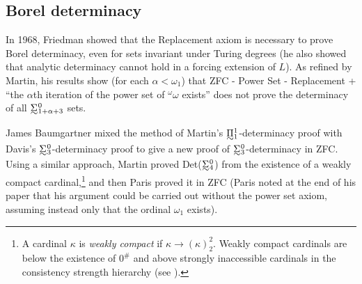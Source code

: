 \documentclass{book}%
\newcommand{\breals}{{^{\omega}}\omega}
\def\underTilde#1{{\baselineskip=0pt\vtop{\hbox{$#1$}\hbox{$\sim$}}}{}}
\newcommand{\uTPi}{\underTilde{\Pi}}
\newcommand{\uTSigma}{\underTilde{\Sigma}}
\begin{document}
\subsection{Borel determinacy}\label{Borelsub}


In 1968, Friedman  showed that the Replacement axiom is
necessary to prove Borel determinacy, even for sets invariant under Turing degrees (he also showed that
analytic determinacy cannot hold in a forcing extension of $L$).
As refined by Martin,
his results show (for each $\alpha < \omega_{1}$) that ZFC -
Power Set - Replacement +
``the $\alpha$th iteration of the power set of $\breals$ exists'' does
not prove the determinacy of all $\uTSigma^{0}_{1+ \alpha + 3}$ sets.

James Baumgartner mixed the method of Martin's $\uTPi^{1}_{1}$-determinacy
proof with Davis's $\uTSigma^{0}_{3}$-determinacy proof to give a new
proof of $\uTSigma^{0}_{3}$-determinacy in ZFC. Using a similar
approach, Martin proved Det($\uTSigma^{0}_{4}$) from the existence of
a weakly compact cardinal,\footnote{A cardinal $\kappa$ is \emph{weakly compact}
if $\kappa \to (\kappa)^{2}_{2}$. Weakly compact cardinals are below the existence of $0^{\#}$ and above
strongly inaccessible cardinals in the consistency strength hierarchy (see \cite[pp.~76,472]{Kanamori}).} and then Paris  proved it
in ZFC (Paris noted at the end of his paper that his argument could
be carried out without the power set axiom, assuming instead only
that the ordinal $\omega_{1}$ exists).
\end{document}
